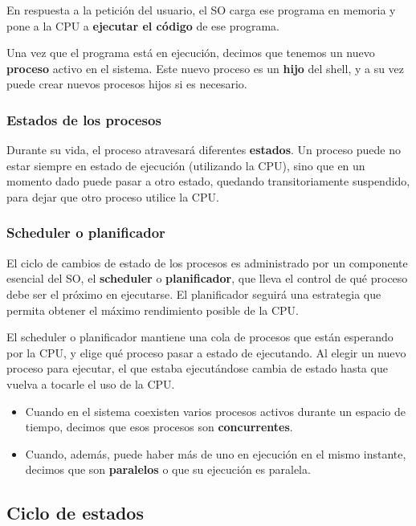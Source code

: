 \documentclass[spanish,A4,]{article}
\begin{document}
En respuesta a la petición del usuario, el SO carga ese programa en
memoria y pone a la CPU a \textbf{ejecutar el código} de ese programa.

Una vez que el programa está en ejecución, decimos que tenemos un nuevo
\textbf{proceso} activo en el sistema. Este nuevo proceso es un
\textbf{hijo} del shell, y a su vez puede crear nuevos procesos hijos si
es necesario.

\subsubsection{Estados de los procesos}\label{estados-de-los-procesos}

Durante su vida, el proceso atravesará diferentes \textbf{estados}. Un
proceso puede no estar siempre en estado de ejecución (utilizando la
CPU), sino que en un momento dado puede pasar a otro estado, quedando
transitoriamente suspendido, para dejar que otro proceso utilice la CPU.

\subsubsection{Scheduler o planificador}\label{scheduler-o-planificador}

El ciclo de cambios de estado de los procesos es administrado por un
componente esencial del SO, el \textbf{scheduler} o
\textbf{planificador}, que lleva el control de qué proceso debe ser el
próximo en ejecutarse. El planificador seguirá una estrategia que
permita obtener el máximo rendimiento posible de la CPU.

El scheduler o planificador mantiene una cola de procesos que están
esperando por la CPU, y elige qué proceso pasar a estado de ejecutando.
Al elegir un nuevo proceso para ejecutar, el que estaba ejecutándose
cambia de estado hasta que vuelva a tocarle el uso de la CPU.

\begin{itemize}
\itemsep1pt\parskip0pt
\item
  Cuando en el sistema coexisten varios procesos activos durante un
  espacio de tiempo, decimos que esos procesos son
  \textbf{concurrentes}.
\item
  Cuando, además, puede haber más de uno en ejecución en el mismo
  instante, decimos que son \textbf{paralelos} o que su ejecución es
  paralela.
\end{itemize}

\subsection{Ciclo de estados}\label{ciclo-de-estados}
\end{document}
